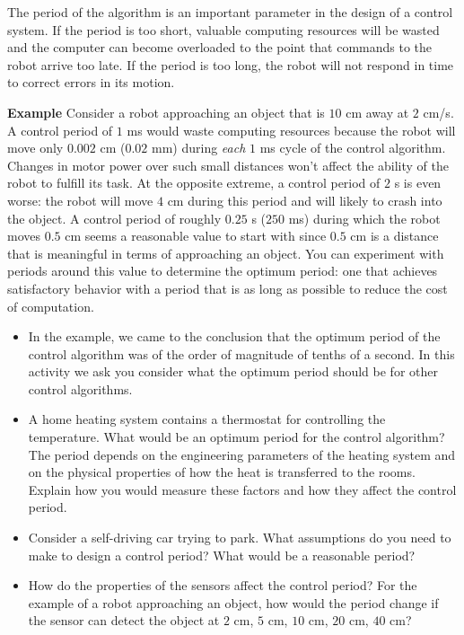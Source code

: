 The period of the algorithm is an important parameter in the design of a control system. If the period is too short, valuable computing resources will be wasted and the computer can become overloaded to the point that commands to the robot arrive too late. If the period is too long, the robot will not respond in time to correct errors in its motion.

\medskip

\noindent\textbf{Example} Consider a robot approaching an object that is $10$ cm away at $2$ cm/s. A control period of $1$ ms would waste computing resources because the robot will move only $0.002$ cm ($0.02$ mm) during \emph{each} $1$ ms cycle of the control algorithm. Changes in motor power over such small distances won't affect the ability of the robot to fulfill its task. At the opposite extreme, a control period of $2$ s is even worse: the robot will move $4$ cm during this period and will likely to crash into the object. A control period of roughly $0.25$ s ($250$ ms) during which the robot moves $0.5$ cm seems a reasonable value to start with since $0.5$ cm is a distance that is meaningful in terms of approaching an object. You can experiment with periods around this value to determine the optimum period: one that achieves satisfactory behavior with a period that is as long as possible to reduce the cost of computation.

\begin{framed}
\begin{itemize}
\item In the example, we came to the conclusion that the optimum period of the control algorithm was of the order of magnitude of tenths of a second. In this activity we ask you consider what the optimum period should be for other control algorithms.
\item A home heating system contains a thermostat for controlling the temperature. What would be an optimum period for the control algorithm? The period depends on the engineering parameters of the heating system and on the physical properties of how the heat is transferred to the rooms. Explain how you would measure these factors and how they affect the control period.
\item Consider a self-driving car trying to park. What assumptions do you need to make to design a control period? What would be a reasonable period?
\item How do the properties of the sensors affect the control period? For the example of a robot approaching an object, how would the period change if the sensor can detect the object at $2$ cm, $5$ cm, $10$ cm, $20$ cm, $40$ cm?
\end{itemize}
\end{framed}


